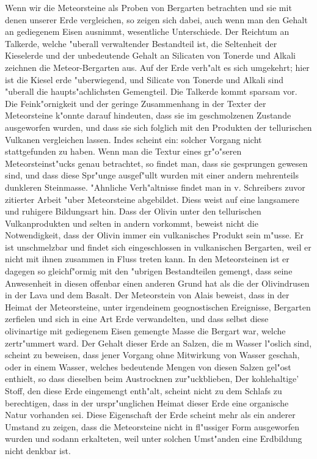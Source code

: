 \documentclass[a4paper, 11pt, oneside]{article}
\begin{document}
Wenn wir die Meteorsteine als Proben von Bergarten betrachten und sie mit denen unserer Erde vergleichen, so zeigen sich dabei, auch wenn man den Gehalt an gediegenem Eisen ausnimmt, wesentliche Unterschiede. Der Reichtum an Talkerde, welche "uberall verwaltender Bestandteil ist, die Seltenheit der Kieselerde und der unbedeutende Gehalt an Silicaten von Tonerde und Alkali zeichnen die Meteor-Bergarten aus. Auf der Erde verh"alt es sich umgekehrt; hier ist die Kiesel erde "uberwiegend, und Silicate von Tonerde und Alkali sind "uberall die haupts"achlichsten Gemengteil. Die Talkerde kommt sparsam vor. Die Feink"ornigkeit und der geringe Zusammenhang in der Texter der Meteorsteine k"onnte darauf hindeuten, dass sie im geschmolzenen Zustande ausgeworfen wurden, und dass sie sich folglich mit den Produkten der tellurischen Vulkanen vergleichen lassen. Indes scheint ein: solcher Vorgang nicht stattgefunden zu haben. Wenn man die Textur eines gr"o"seren Meteorsteinst"ucks genau betrachtet, so findet man, dass sie gesprungen gewesen sind, und dass diese Spr"unge ausgef"ullt wurden mit einer andern mehrenteils dunkleren Steinmasse. "Ahnliche Verh"altnisse findet man in v. Schreibers zuvor zitierter Arbeit "uber Meteorsteine abgebildet. Diess weist auf eine langsamere und ruhigere Bildungsart hin. Dass der Olivin unter den tellurischen Vulkanprodukten und selten in andern vorkommt, beweist nicht die Notwendigkeit, dass der Olivin immer ein vulkanisches Produkt sein m"usse. Er ist unschmelzbar und findet sich eingeschlossen in vulkanischen Bergarten, weil er nicht mit ihnen zusammen in Fluss treten kann. In den Meteorsteinen ist er dagegen so gleichf"ormig mit den "ubrigen Bestandteilen gemengt, dass seine Anwesenheit in diesen offenbar einen anderen Grund hat als die der Olivindrusen in der Lava und dem Basalt. Der Meteorstein von Alais beweist, dass in der Heimat der Meteorsteine, unter irgendeinem geognostischen Ereignisse, Bergarten zerfielen und sich in eine Art Erde verwandelten, und dass selbst diese olivinartige mit gediegenem Eisen gemengte Masse die Bergart war, welche zertr"ummert ward. Der Gehalt dieser Erde an Salzen, die m Wasser l"oslich sind, scheint zu beweisen, dass jener Vorgang ohne Mitwirkung von Wasser geschah, oder in einem Wasser, welches bedeutende Mengen von diesen Salzen gel"ost enthielt, so dass dieselben beim Austrocknen zur"uckblieben, Der kohlehaltige' Stoff, den diese Erde eingemengt enth"alt, scheint nicht zu dem Schlafs zu berechtigen, dass in der urspr"unglichen Heimat dieser Erde eine organische Natur vorhanden sei. Diese Eigenschaft der Erde scheint mehr als ein anderer Umstand zu zeigen, dass die Meteorsteine nicht in fl"ussiger Form ausgeworfen wurden und sodann erkalteten, weil unter solchen Umst"anden eine Erdbildung nicht denkbar ist.
\end{document}
